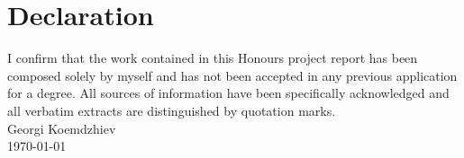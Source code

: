 \chapter{Declaration}
I confirm that the work contained in this Honours project report has been composed solely by myself and has not been accepted in any previous application for a degree. All sources of information have been specifically acknowledged and all verbatim extracts are distinguished by quotation marks.\\[2cm]

  \noindent Georgi Koemdzhiev\\
  \today